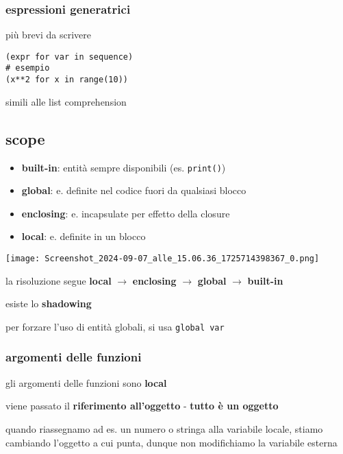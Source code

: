 \subsubsection{espressioni generatrici}

pi\`u brevi da scrivere

\begin{verbatim}
(expr for var in sequence)
# esempio
(x**2 for x in range(10))
\end{verbatim}

simili alle list comprehension

\subsection{scope}

\begin{minipage}[c]{.5\textwidth}
\begin{itemize}
\item \textbf{built-in}: entit\`a sempre disponibili (es. \texttt{print()})
\item \textbf{global}: e. definite nel codice fuori da qualsiasi blocco
\item \textbf{enclosing}: e. incapsulate per effetto della closure
\item \textbf{local}: e. definite in un blocco
\end{itemize}
\end{minipage}
\begin{minipage}[c]{.5\textwidth}
\texttt{[image: Screenshot\_2024-09-07\_alle\_15.06.36\_1725714398367\_0.png]}
\end{minipage}

la risoluzione segue \textbf{local} $\rightarrow$ \textbf{enclosing} $\rightarrow$ \textbf{global} $\rightarrow$ \textbf{built-in}

esiste lo \textbf{shadowing}

per forzare l'uso di entit\`a globali, si usa \texttt{global var}

\subsubsection{argomenti delle funzioni}

gli argomenti delle funzioni sono \textbf{local}

viene passato il \textbf{riferimento all'oggetto} - \textbf{tutto \`e un oggetto}

quando riassegnamo ad es. un numero o stringa alla variabile locale, stiamo cambiando l'oggetto a cui punta, dunque non modifichiamo la variabile esterna

